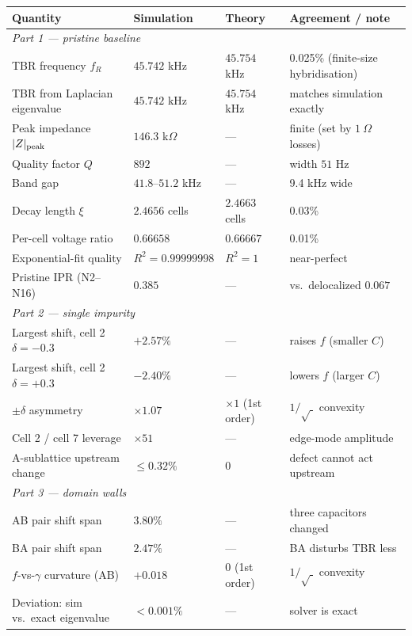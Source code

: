 \documentclass[11pt]{article}
\begin{document}
\renewcommand{\arraystretch}{1.25}
\begin{longtable}{p{4.9cm}p{3.0cm}p{3.0cm}p{4.4cm}}
\toprule
\textbf{Quantity} & \textbf{Simulation} & \textbf{Theory} &
\textbf{Agreement / note}\\
\midrule
\endhead
\multicolumn{4}{l}{\textit{Part 1 --- pristine baseline}}\\
TBR frequency $f_R$        & $45.742$ kHz & $45.754$ kHz & 0.025\% (finite-size hybridisation)\\
TBR from Laplacian eigenvalue & $45.742$ kHz & $45.754$ kHz & matches simulation exactly\\
Peak impedance $|Z|_{\rm peak}$ & $146.3$ k$\Omega$ & --- & finite (set by $1\ \Omega$ losses)\\
Quality factor $Q$        & $892$ & --- & width $51$ Hz\\
Band gap                  & $41.8$--$51.2$ kHz & --- & 9.4 kHz wide\\
Decay length $\xi$        & $2.4656$ cells & $2.4663$ cells & 0.03\%\\
Per-cell voltage ratio    & $0.66658$ & $0.66667$ & 0.01\%\\
Exponential-fit quality   & $R^2=0.99999998$ & $R^2=1$ & near-perfect\\
Pristine IPR (N2--N16)    & $0.385$ & --- & vs.\ delocalized $0.067$\\
\midrule
\multicolumn{4}{l}{\textit{Part 2 --- single impurity}}\\
Largest shift, cell 2 $\delta=-0.3$ & $+2.57\%$ & --- & raises $f$ (smaller $C$)\\
Largest shift, cell 2 $\delta=+0.3$ & $-2.40\%$ & --- & lowers $f$ (larger $C$)\\
$\pm\delta$ asymmetry      & $\times1.07$ & $\times1$ (1st order) & $1/\sqrt{\;}$ convexity\\
Cell 2 / cell 7 leverage  & $\times51$ & --- & edge-mode amplitude\\
A-sublattice upstream change & $\le0.32\%$ & $0$ & defect cannot act upstream\\
\midrule
\multicolumn{4}{l}{\textit{Part 3 --- domain walls}}\\
AB pair shift span        & $3.80\%$ & --- & three capacitors changed\\
BA pair shift span        & $2.47\%$ & --- & BA disturbs TBR less\\
$f$-vs-$\gamma$ curvature (AB) & $+0.018$ & $0$ (1st order) & $1/\sqrt{\;}$ convexity\\
Deviation: sim vs.\ exact eigenvalue & $<0.001\%$ & --- & solver is exact\\

\end{longtable}
\end{document}
